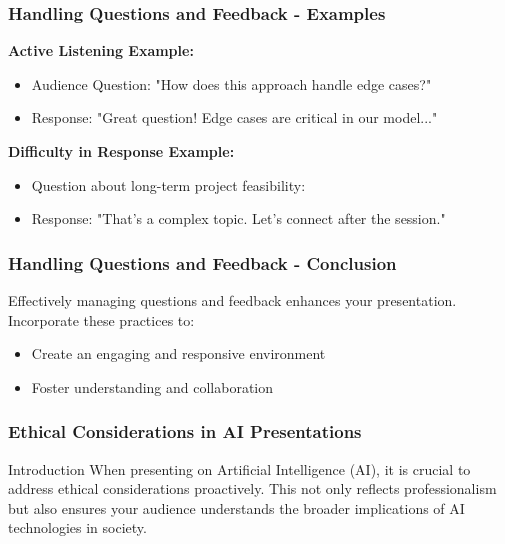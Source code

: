 \documentclass[aspectratio=169]{beamer}
\begin{document}
\begin{frame}[fragile]
  \frametitle{Handling Questions and Feedback - Examples}
  \textbf{Active Listening Example:}
  \begin{itemize}
    \item Audience Question: "How does this approach handle edge cases?"
    \item Response: "Great question! Edge cases are critical in our model..."
  \end{itemize}

  \textbf{Difficulty in Response Example:}
  \begin{itemize}
    \item Question about long-term project feasibility: 
    \item Response: "That’s a complex topic. Let’s connect after the session."
  \end{itemize}
\end{frame}

\begin{frame}[fragile]
  \frametitle{Handling Questions and Feedback - Conclusion}
  Effectively managing questions and feedback enhances your presentation. 
  Incorporate these practices to:
  \begin{itemize}
    \item Create an engaging and responsive environment
    \item Foster understanding and collaboration
  \end{itemize}
\end{frame}

\begin{frame}[fragile]
    \frametitle{Ethical Considerations in AI Presentations}
    \begin{block}{Introduction}
        When presenting on Artificial Intelligence (AI), it is crucial to address ethical considerations proactively. This not only reflects professionalism but also ensures your audience understands the broader implications of AI technologies in society.
    \end{block}
\end{frame}
\end{document}
